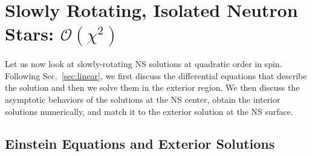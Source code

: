 \documentclass[aps,twocolumn,nofootinbib,showpacs,superscriptaddress,hyperref]{revtex4-1}
\begin{document}
\section{Slowly Rotating, Isolated Neutron Stars: $\mathcal{O}(\chi^2)$}
\label{sec:quadratic}

Let us now look at slowly-rotating NS solutions at quadratic order in spin. Following Sec.~\ref{sec:linear}, we first discuss the differential equations that describe the solution and then we solve them in the exterior region. We then discuss the asymptotic behaviors of the solutions at the NS center, obtain the interior solutions numerically, and match it to the exterior solution at the NS surface.

\subsection{Einstein Equations and Exterior Solutions}
\end{document}
